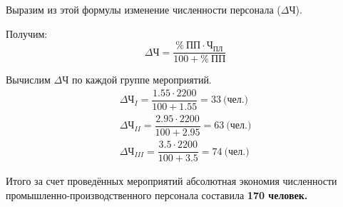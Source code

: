 Выразим из этой формулы изменение численности персонала ($ \Delta\text{Ч} $).

Получим:
\begin{equation}
\Delta\text{Ч} = \dfrac{\% ~ \text{ПП} \cdot \text{Ч}_{\text{ПЛ}}}{100 + \% ~ \text{ПП}}
\end{equation}

Вычислим $ \Delta\text{Ч} $ по каждой группе мероприятий.
\begin{align*}
  \Delta\text{Ч}_{I} = \dfrac{1.55 \cdot 2200}{100 + 1.55} = 33 ~ \text{(чел.)} \\
  \Delta\text{Ч}_{II} = \dfrac{2.95 \cdot 2200}{100 + 2.95} = 63 ~ \text{(чел.)} \\
  \Delta\text{Ч}_{III} = \dfrac{3.5 \cdot 2200}{100 + 3.5} = 74 ~ \text{(чел.)}
\end{align*}

Итого за счет проведённых мероприятий абсолютная экономия численности
промышленно-производственного персонала составила \textbf{170 человек.}

\newpage

